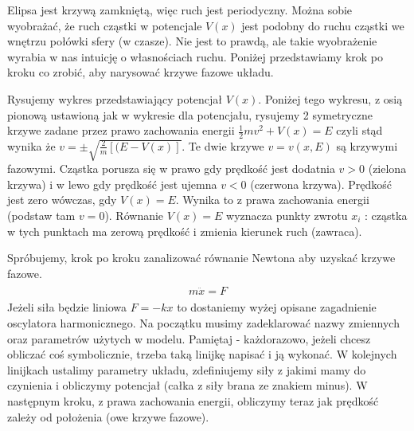 \documentclass[a4paper,12pt,polish]{sphinxmanual}
\begin{document}
Elipsa jest krzywą zamkniętą, więc ruch jest periodyczny. Można sobie wyobrażać, że ruch cząstki w potencjale $V(x)$ jest  podobny do  ruchu cząstki we wnętrzu połówki sfery (w czasze). Nie jest to prawdą, ale takie wyobrażenie wyrabia w nas intuicję o własnościach ruchu. Poniżej przedstawiamy krok po kroku co zrobić, aby narysować krzywe fazowe układu.

Rysujemy wykres przedstawiający potencjał $V(x)$. Poniżej tego wykresu, z osią pionową ustawioną jak w wykresie dla potencjału, rysujemy 2 symetryczne krzywe zadane przez prawo zachowania energii $\frac{1}{2}m v^2 + V(x) = E$ czyli stąd wynika że $v = \pm \sqrt{\frac{2}{m}[(E-V(x)]}$. Te dwie krzywe $v=v(x, E)$ są krzywymi fazowymi.
Cząstka porusza się w prawo gdy prędkość jest dodatnia $v>0$ (zielona krzywa) i w lewo gdy prędkość jest ujemna $v<0$ (czerwona krzywa). Prędkość jest zero wówczas, gdy $V(x) = E$. Wynika to z prawa zachowania energii (podstaw tam $v=0$). Równanie $V(x) = E$ wyznacza punkty zwrotu $x_i$ : cząstka w tych punktach ma zerową prędkość i zmienia kierunek ruch (zawraca).

Spróbujemy, krok po kroku zanalizować równanie Newtona aby uzyskać krzywe fazowe.
\label{ch1/chI022:equation-eqn10}\begin{gather}
\begin{split}m \ddot{x} = F\end{split}\label{ch1/chI022-eqn10}
\end{gather}
Jeżeli siła będzie liniowa $F=-kx$ to dostaniemy wyżej opisane zagadnienie oscylatora harmonicznego. Na początku musimy zadeklarować nazwy zmiennych oraz parametrów użytych w modelu. Pamiętaj - każdorazowo, jeżeli chcesz obliczać coś symbolicznie, trzeba taką linijkę napisać i ją wykonać. W kolejnych linijkach ustalimy parametry układu, zdefiniujemy siły z jakimi mamy do czynienia i obliczymy potencjał (całka z siły brana ze znakiem minus). W następnym kroku, z prawa zachowania energii, obliczymy teraz jak prędkość zależy od położenia (owe krzywe fazowe).
\end{document}
